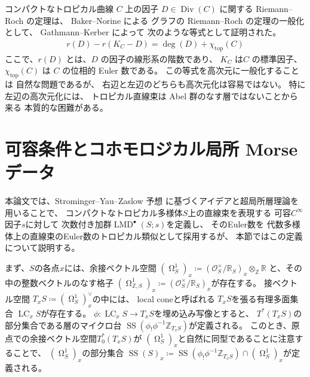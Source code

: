 \documentclass[uplatex,dvipdfmx,12pt]{jsarticle}
\numberwithin{equation}{section}
\theoremstyle{definition}
\newcommand{\deq}{\coloneqq}
\newcommand{\opn}[1]{\operatorname{#1}}
\newcommand{\beforesection}{\vspace{-15pt}}
\newcommand{\aftersection}{\vspace{-8pt}}
\DeclareMathOperator{\tform}{\Omega}
\begin{document}
コンパクトなトロピカル曲線 $C$ 上の因子 
$D\in \opn{Div}(C)$
に関する Riemann--Roch の定理は、
Baker--Norine による
グラフの Riemann--Roch の定理の一般化として、
Gathmann--Kerber
\cite{gathmannRiemannRochTheoremTropical2008a} によって 
次のような等式として証明された。
\begin{align} \label{equation-tropical-rr}
r(D)-r(K_C-D)=\opn{deg}(D)+\chi_{\mathrm{top}}(C)
\end{align}
ここで、$r(D)$ とは、$D$ の因子の線形系の階数であり、
$K_C$ は$C$ の標準因子、$\chi_{\mathrm{top}}(C)$ は
$C$ の位相的 Euler 数である。
この等式を高次元に一般化することは
自然な問題であるが、
右辺と左辺のどちらも高次元化は容易ではない。
特に左辺の高次元化には、
トロピカル直線束は Abel 群のなす層ではないことから来る
本質的な困難がある。

\beforesection

\section{可容条件とコホモロジカル局所 Morse データ}

\aftersection

本論文では、Strominger--Yau--Zaslow 予想
\cite{stromingerMirrorSymmetryTduality1996}
に基づくアイデアと超局所層理論\cite{MR1299726}を
用いることで、
コンパクトなトロピカル多様体$S$上の直線束を表現する 
可容$C^{\infty}$因子$s$に対して
次数付き加群$\opn{LMD}^{\bullet}(S;s)$を定義し、
そのEuler数を
代数多様体上の直線束のEuler数のトロピカル類似として採用するが、
本節ではこの定義について説明する。

まず、$S$の各点$x$には、余接ベクトル空間
$(\tform^{1}_{S})_x\deq
(\mathcal{O}_S^{\times}/\mathbb{R}_S)_x
\otimes_{\mathbb{Z}}\mathbb{R}$
と、その中の整数ベクトルのなす格子
$(\tform^{1}_{\mathbb{Z},S})_x\deq
(\mathcal{O}_S^{\times}/\mathbb{R}_S)_x$が存在する。
接ベクトル空間
$T_x S\deq(\tform^{1}_{S})_x^{\vee}$の中には、
local coneと呼ばれる
$T_xS$を張る有理多面集合
$\opn{LC}_x S$が存在する。
$\phi \colon \opn{LC}_x S\to T_x S$を埋め込み写像とすると、
$T^{*}(T_xS)$の部分集合である層のマイクロ台
$\opn{SS}(\phi_!\phi^{-1}\mathbb{Z}_{T_xS})$が定義される。
このとき、原点での余接ベクトル空間$T^{*}_0(T_xS)$が
$(\tform_S^{1})_x$と自然に同型であることに注意することで、
$(\tform_S^{1})_x$の部分集合
$\opn{SS}(S)_x\deq \opn{SS}(\phi_!\phi^{-1}\mathbb{Z}_{T_xS})
\cap (\tform_S^{1})_x$が定義される。
\end{document}
